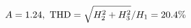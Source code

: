 \documentclass[preview]{standalone}
\begin{document}
\begin{align*}
\special{dvisvgm:raw <g id='unique000'>}A=1.24,\ \text{THD}=\sqrt{H_2^2+H_3^2}/H_1=20.4\%\special{dvisvgm:raw </g>}
\end{align*}
\end{document}
